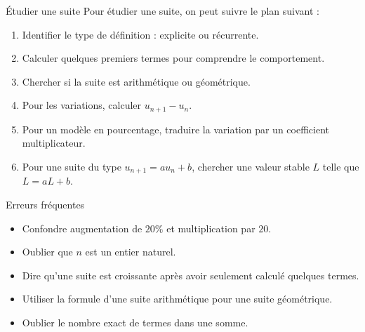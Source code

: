 \documentclass[11pt,a4paper]{article}
\begin{document}
\begin{methodbox}{Étudier une suite}
Pour étudier une suite, on peut suivre le plan suivant :
\begin{enumerate}
  \item Identifier le type de définition : explicite ou récurrente.
  \item Calculer quelques premiers termes pour comprendre le comportement.
  \item Chercher si la suite est arithmétique ou géométrique.
  \item Pour les variations, calculer \(u_{n+1}-u_n\).
  \item Pour un modèle en pourcentage, traduire la variation par un coefficient multiplicateur.
  \item Pour une suite du type \(u_{n+1}=au_n+b\), chercher une valeur stable \(L\) telle que \(L=aL+b\).
\end{enumerate}
\end{methodbox}

\begin{warningbox}{Erreurs fréquentes}
\begin{itemize}
  \item Confondre augmentation de \(20\%\) et multiplication par \(20\).
  \item Oublier que \(n\) est un entier naturel.
  \item Dire qu'une suite est croissante après avoir seulement calculé quelques termes.
  \item Utiliser la formule d'une suite arithmétique pour une suite géométrique.
  \item Oublier le nombre exact de termes dans une somme.
\end{itemize}
\end{warningbox}
\end{document}
